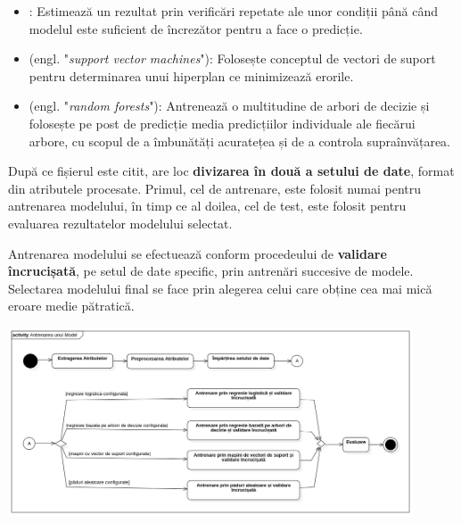 \documentclass[../../main.tex]{subfiles}
\begin{document}
\begin{itemize}
    \item {}: Estimează un rezultat prin verificări repetate ale unor condiții până când modelul este suficient de încrezător pentru a face o predicție.
    \item {} (engl. "\textit{support vector machines}"): Folosește conceptul de vectori de suport pentru determinarea unui hiperplan ce minimizează erorile.
    \item {} (engl. "\textit{random forests}"): Antrenează o multitudine de arbori de decizie și folosește pe post de predicție media predicțiilor individuale ale fiecărui arbore, cu scopul de a îmbunătăți acuratețea și de a controla supraînvățarea.
\end{itemize}

După ce fișierul este citit, are loc \textbf{divizarea în două a setului de date}, format din atributele procesate. Primul, cel de antrenare, este folosit numai pentru antrenarea modelului, în timp ce al doilea, cel de test, este folosit pentru evaluarea rezultatelor modelului selectat.

Antrenarea modelului se efectuează conform procedeului de \textbf{validare în\-crucișată}, pe setul de date specific, prin antrenări succesive de modele. Selectarea modelului final se face prin alegerea celui care obține cea mai mică eroare medie pătratică.

\vspace{0.3cm}
\begin{center}
    \includegraphics[width=12cm]{components/images/diagrams/activity_diagram_model_training.png}
    \label{fig:activity_diagram_model_training}
    \captionsetup{justification=centering,margin=1cm}
\end{center}
\end{document}
